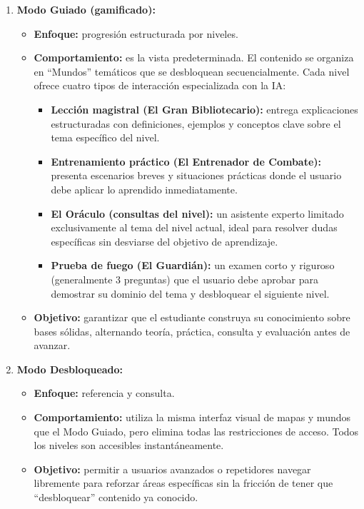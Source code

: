 \begin{enumerate}
    \item \textbf{Modo Guiado (gamificado):}
    \begin{itemize}
        \item \textbf{Enfoque:} progresión estructurada por niveles.
        \item \textbf{Comportamiento:} es la vista predeterminada. El contenido se organiza en ``Mundos'' temáticos que se desbloquean secuencialmente. Cada nivel ofrece cuatro tipos de interacción especializada con la IA:
        \begin{itemize}
            \item \textbf{Lección magistral (El Gran Bibliotecario):} entrega explicaciones estructuradas con definiciones, ejemplos y conceptos clave sobre el tema específico del nivel.
            \item \textbf{Entrenamiento práctico (El Entrenador de Combate):} presenta escenarios breves y situaciones prácticas donde el usuario debe aplicar lo aprendido inmediatamente.
            \item \textbf{El Oráculo (consultas del nivel):} un asistente experto limitado exclusivamente al tema del nivel actual, ideal para resolver dudas específicas sin desviarse del objetivo de aprendizaje.
            \item \textbf{Prueba de fuego (El Guardián):} un examen corto y riguroso (generalmente 3 preguntas) que el usuario debe aprobar para demostrar su dominio del tema y desbloquear el siguiente nivel.
        \end{itemize}
        \item \textbf{Objetivo:} garantizar que el estudiante construya su conocimiento sobre bases sólidas, alternando teoría, práctica, consulta y evaluación antes de avanzar.
    \end{itemize}

    \item \textbf{Modo Desbloqueado:}
    \begin{itemize}
        \item \textbf{Enfoque:} referencia y consulta.
        \item \textbf{Comportamiento:} utiliza la misma interfaz visual de mapas y mundos que el Modo Guiado, pero elimina todas las restricciones de acceso. Todos los niveles son accesibles instantáneamente.
        \item \textbf{Objetivo:} permitir a usuarios avanzados o repetidores navegar libremente para reforzar áreas específicas sin la fricción de tener que ``desbloquear'' contenido ya conocido.
    \end{itemize}


\end{enumerate}
